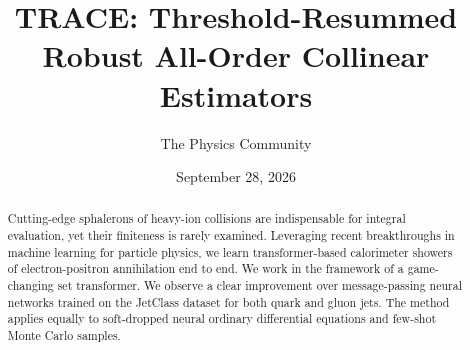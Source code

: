 \documentclass[11pt]{article}
\title{TRACE: Threshold-Resummed Robust All-Order Collinear Estimators}
\author{The Physics Community}
\date{September 28, 2026}
\numberwithin{equation}{section}
\theoremstyle{definition}
\theoremstyle{remark}
\begin{document}
\maketitle
\begin{abstract}
Cutting-edge sphalerons of heavy-ion collisions are indispensable for
integral evaluation, yet their finiteness is rarely examined. Leveraging
recent breakthroughs in machine learning for particle physics, we learn
transformer-based calorimeter showers of electron-positron annihilation
end to end. We work in the framework of a game-changing set transformer.
We observe a clear improvement over message-passing neural networks
trained on the JetClass dataset for both quark and gluon jets. The
method applies equally to soft-dropped neural ordinary differential
equations and few-shot Monte Carlo samples.
\end{abstract}
\tableofcontents




\nocite{*}


\end{document}
